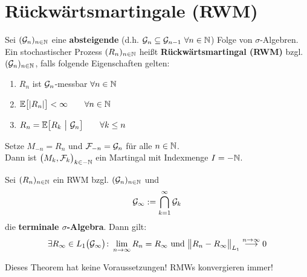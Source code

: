 \setcounter{section}{1}
\section{Rückwärtsmartingale (RWM)} %
\begin{defi}
	Sei $(\mathcal{G}_n)_{n\in\mathbb{N}}$ eine \textbf{absteigende} (d.h. $\mathcal{G}_{n}\subseteq\mathcal{G}_{n-1}~\forall n\in\mathbb{N}$) Folge von $\sigma$-Algebren.\\
	Ein stochastischer Prozess $(R_n)_{n\in\mathbb{N}}$ heißt \textbf{Rückwärtsmartingal (RWM)} bzgl.\\ $(\mathcal{G}_n)_{n\in\mathbb{N}}$, falls folgende Eigenschaften gelten:
	\begin{enumerate}
		\item $R_n$ ist $\mathcal{G}_n$-messbar $\forall n\in\mathbb{N}$
		\item $\begin{aligned}
			\mathbb{E}\big[|R_n|\big]<\infty\qquad\forall n\in\mathbb{N}
		\end{aligned}$
		\item $\begin{aligned}
			R_n=\mathbb{E}\big[R_k~\big|~\mathcal{G}_n\big]\qquad\forall k\leq n
		\end{aligned}$
	\end{enumerate} 
\end{defi}

\begin{bemerkung}
	Setze $M_{-n}=R_n$  und $\mathcal{F}_{-n}=\mathcal{G}_n$ für alle $n\in\mathbb{N}$.\\
	Dann ist $\big(M_k,\mathcal{F}_k\big)_{k\in-\mathbb{N}}$ ein Martingal mit Indexmenge $I=-\mathbb{N}$.
\end{bemerkung}

\begin{theorem}\label{theorem5.5KonvergenzVonRWMs}\enter
	Sei $(R_n)_{n\in\mathbb{N}}$ ein RWM bzgl. $(\mathcal{G}_n)_{n\in\mathbb{N}}$ und 
	\begin{align*}
		\mathcal{G}_\infty:=\bigcap\limits_{k=1}^\infty\mathcal{G}_k
	\end{align*}
	die \textbf{terminale $\sigma$-Algebra}. Dann gilt:
	\begin{align*}
		\exists R_\infty\in L_1\big(\mathcal{G}_\infty\big)\colon\lim\limits_{n\to\infty} R_n=R_\infty \text{ und } \big\Vert R_n-R_\infty\big\Vert_{L_1}\stackrel{n\to\infty}{\longrightarrow}0
	\end{align*}
\end{theorem}

\begin{bemerkung}
	Dieses Theorem hat keine Voraussetzungen! RMWs konvergieren immer!
\end{bemerkung}

